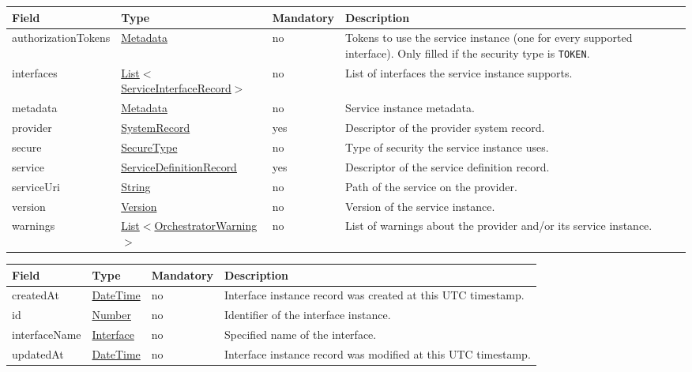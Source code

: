 \documentclass[a4paper]{arrowhead}
\newcommand{\pref}[1]{{\textcolor{ArrowheadGrey}{\hyperref[sec:model:primitives:#1]{#1}}}}
\begin{document}
\begin{table}[ht!]
\begin{tabularx}{\textwidth}{| p{3.5cm} | p{4.6cm} | p{2cm} | X |} \hline
\rowcolor{gray!33} Field & Type & Mandatory & Description \\ \hline
authorizationTokens & \hyperref[sec:model:Metadata]{Metadata} & no & Tokens to use the service instance (one for every supported interface). Only filled if the security type is \texttt{TOKEN}. \\ \hline
interfaces & \pref{List}$<$\hyperref[sec:model:ServiceInterfaceRecord]{ServiceInterfaceRecord}$>$ & no & List of interfaces the service instance supports. \\ \hline
metadata & \hyperref[sec:model:Metadata]{Metadata} & no & Service instance metadata. \\ \hline
provider & \hyperref[sec:model:SystemRecord]{SystemRecord} & yes & Descriptor of the provider system record. \\ \hline
secure & \pref{SecureType} & no & Type of security the service instance uses. \\ \hline
service & \hyperref[sec:model:ServiceDefinitionRecord]{ServiceDefinitionRecord} & yes & Descriptor of the service definition record. \\ \hline
serviceUri & \pref{String} & no & Path of the service on the provider. \\ \hline
version & \pref{Version} & no & Version of the service instance. \\ \hline
warnings & \pref{List}$<$\pref{OrchestratorWarning}$>$ & no & List of warnings about the provider and/or its service instance. \\ \hline

\end{tabularx}
\end{table}

\label{sec:model:ServiceInterfaceRecord}

\begin{table}[ht!]
\begin{tabularx}{\textwidth}{| p{4cm} | p{4cm} | p{2cm} | X |} \hline
\rowcolor{gray!33} Field & Type & Mandatory & Description \\ \hline
createdAt & \pref{DateTime} & no & Interface instance record was created at this UTC time\-stamp. \\ \hline
id & \pref{Number} & no & Identifier of the interface instance. \\ \hline
interfaceName &\pref{Interface} & no & Specified name of the interface. \\ \hline
updatedAt & \pref{DateTime} & no & Interface instance record was modified at this UTC time\-stamp. \\ \hline
\end{tabularx}
\end{table}
\end{document}
